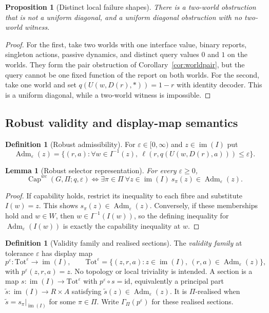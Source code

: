 \documentclass[11pt]{article}
\theoremstyle{plain}
\newtheorem{proposition}[theorem]{Proposition}
\newtheorem{lemma}[theorem]{Lemma}
\theoremstyle{definition}
\newtheorem{definition}[theorem]{Definition}
\theoremstyle{remark}
\newcommand{\im}{\operatorname{im}}
\newcommand{\Capability}{\operatorname{Cap}}
\newcommand{\Adm}{\operatorname{Adm}}
\newcommand{\eps}{\varepsilon}
\begin{document}
\begin{proposition}[Distinct local failure shapes]\label{prop:failure-shapes}
There is a two-world obstruction that is not a uniform diagonal, and a uniform
diagonal obstruction with no two-world witness.
\end{proposition}

\begin{proof}
For the first, take two worlds with one interface value, binary reports,
singleton actions, passive dynamics, and distinct query values $0$ and $1$ on
the worlds. They form the pair obstruction of
Corollary~\ref{cor:worldpair}, but the query cannot be one fixed function of the
report on both worlds. For the second, take one world and set
$q(U(w,D(r),\ast))=1-r$ with identity decoder. This is a uniform diagonal, while
a two-world witness is impossible.
\end{proof}


\subsection{Robust validity and display-map semantics}

\begin{definition}[Robust admissibility]\label{def:eps}
For $\eps\in[0,\infty)$ and $z\in\im(I)$ put
\[
\Adm_\eps(z)=\{(r,a):\forall w\in I^{-1}(z),
\ \ell(r,q(U(w,D(r),a)))\le\eps\}.
\]
\end{definition}

\begin{lemma}[Robust selector representation]\label{lem:robust-selector}
For every $\eps\ge0$,
\[
\Capability^{wc}(G,\Pi;q,\eps)
\iff
\exists\pi\in\Pi\ \forall z\in\im(I)\ s_\pi(z)\in\Adm_\eps(z).
\]
\end{lemma}

\begin{proof}
If capability holds, restrict its inequality to each fibre and substitute
$I(w)=z$. This shows $s_\pi(z)\in\Adm_\eps(z)$. Conversely, if these memberships
hold and $w\in W$, then $w\in I^{-1}(I(w))$, so the defining inequality for
$\Adm_\eps(I(w))$ is exactly the capability inequality at $w$.
\end{proof}

\begin{definition}[Validity family and realised sections]\label{def:bundle}
The \emph{validity family} at tolerance $\eps$ has display map
\[
p^\eps:\mathrm{Tot}^\eps\to\im(I),\qquad
\mathrm{Tot}^\eps=
\{(z,r,a):z\in\im(I),\ (r,a)\in\Adm_\eps(z)\},
\]
with $p^\eps(z,r,a)=z$. No topology or local triviality is intended. A section
is a map $s:\im(I)\to\mathrm{Tot}^\eps$ with
$p^\eps\circ s=\mathrm{id}$, equivalently a principal part
$\widetilde s:\im(I)\to R\times A$ satisfying
$\widetilde s(z)\in\Adm_\eps(z)$. It is $\Pi$-realised when
$\widetilde s=s_\pi|_{\im(I)}$ for some $\pi\in\Pi$. Write
$\Gamma_\Pi(p^\eps)$ for these realised sections.
\end{definition}
\end{document}
